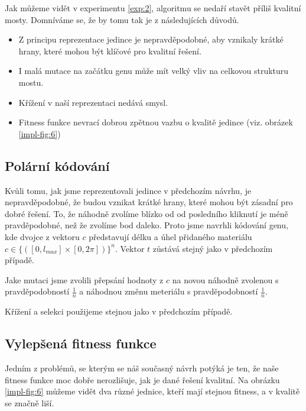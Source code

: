 Jak můžeme vidět v experimentu \ref{exp:2}, algoritmu se nedaří stavět příliš kvalitní mosty. Domníváme se, že by tomu tak je z následujících důvodů.

\begin{itemize}
    \item Z principu reprezentace jedince je nepravděpodobné, aby vznikaly krátké hrany, které mohou být klíčové pro kvalitní řešení.
    \item I malá mutace na začátku genu může mít velký vliv na celkovou strukturu mostu.
    \item Křížení v naší reprezentaci nedává smysl.
    \item Fitness funkce nevrací dobrou zpětnou vazbu o kvalitě jedince (viz. obrázek \ref{impl-fig:6})
\end{itemize}

\subsection{Polární kódování}

Kvůli tomu, jak jsme reprezentovali jedince v předchozím návrhu, je nepravděpodobné, že budou vznikat krátké hrany, které mohou být zásadní pro dobré řešení. To, že náhodně zvolíme blízko od od posledního kliknutí je méně pravděpodobné, než že zvolíme bod daleko. Proto jsme navrhli kódování genu, kde dvojce z vektoru $c$ představují délku a úhel přidaného materiálu $c \in \{([0, l_{max}] \times [0, 2 \pi])\}^n$. Vektor $t$ zůstává stejný jako v předchozím případě.

Jake mutaci jsme zvolili přepsání hodnoty z $c$ na novou náhodně zvolenou s pravděpodobností $\frac{1}{n}$ a náhodnou změnu meteriálu s pravděpodobností $\frac{1}{n}$.

Křížení a selekci použijeme stejnou jako v předchozím případě.

\subsection{Vylepšená fitness funkce}

Jedním z problémů, se kterým se náš současný návrh potýká je ten, že naše fitness funkce moc dobře nerozlišuje, jak je dané řešení kvalitní. Na obrázku \ref{impl-fig:6} můžeme vidět dva různé jednice, kteří mají stejnou fitness, a v kvalitě se značně liší.



